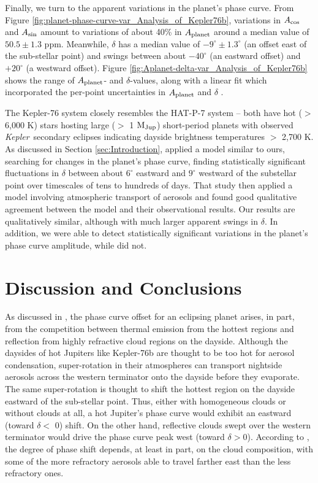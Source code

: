 \documentclass[manuscript]{aastex62}
\newcommand{\kepler}{{\it Kepler}}
\begin{document}
Finally, we turn to the apparent variations in the planet's phase curve. From Figure \ref{fig:planet-phase-curve-var_Analysis_of_Kepler76b}, variations in $A_{\rm cos}$ and $A_{\rm sin}$ amount to variations of about 40\% in $A_{\rm planet}$ around a median value of $50.5 \pm 1.3$ ppm. Meanwhile, $\delta$ has a median value of $-9^\circ \pm 1.3^\circ$ (an offset east of the sub-stellar point) and swings between about $-40^\circ$ (an eastward offset) and $+20^\circ$ (a westward offset). Figure \ref{fig:Aplanet-delta-var_Analysis_of_Kepler76b} shows the range of $A_{\rm planet}$- and $\delta$-values, along with a linear fit which incorporated the per-point uncertainties in $A_{\rm planet}$ and $\delta$ \citep{boggs1990orthogonal}.

The Kepler-76 system closely resembles the HAT-P-7 system -- both have hot ($>$ 6,000 K) stars hosting large ($>$ 1 ${\rm M_{Jup}}$) short-period planets with observed \kepler\ secondary eclipses indicating dayside brightness temperatures $>$ 2,700 K. As discussed in Section \ref{sec:Introduction}, \citet{2016NatAs...1E...4A} applied a model similar to ours, searching for changes in the planet's phase curve, finding statistically significant fluctuations in $\delta$ between about $6^\circ$ eastward and $9^\circ$ westward of the substellar point over timescales of tens to hundreds of days. That study then applied a model involving atmospheric transport of aerosols and found good qualitative agreement between the model and their observational results. Our results are qualitatively similar, although with much larger apparent swings in $\delta$. In addition, we were able to detect statistically significant variations in the planet's phase curve amplitude, while \citet{2016NatAs...1E...4A} did not.

\section{Discussion and Conclusions}
\label{sec:Discussion}


As discussed in \citet{2016ApJ...828...22P}, the phase curve offset for an eclipsing planet arises, in part, from the competition between thermal emission from the hottest regions and reflection from highly refractive cloud regions on the dayside. Although the daysides of hot Jupiters like Kepler-76b are thought to be too hot for aerosol condensation, super-rotation in their atmospheres can transport nightside aerosols across the western terminator onto the dayside before they evaporate. The same super-rotation is thought to shift the hottest region on the dayside eastward of the sub-stellar point. Thus, either with homogeneous clouds or without clouds at all, a hot Jupiter's phase curve would exhibit an eastward (toward $\delta <$ 0) shift. On the other hand, reflective clouds swept over the western terminator would drive the phase curve peak west (toward $\delta > 0$). According to \citet{2016ApJ...828...22P}, the degree of phase shift depends, at least in part, on the cloud composition, with some of the more refractory aerosols able to travel farther east than the less refractory ones. 
\end{document}
